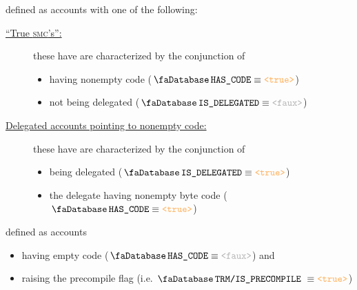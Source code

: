 \begin{description}
\begin{description}
		\end{description}
	\item[\underline{\underline{Smart contracts:}}]
		defined as accounts with
		one of the following:
		\begin{description}
			\item[\underline{``True \textsc{smc}'s'':}]
				these have are characterized by the conjunction of
				\begin{itemize}
					\item having nonempty code ($\accHasCode \equiv \true$)
					\item not being delegated ($\accIsDelegated \equiv \false$)
				\end{itemize}
			\item[\underline{Delegated accounts pointing to nonempty code:}]
				these have are characterized by the conjunction of
				\begin{itemize}
					\item being delegated ($\accIsDelegated \equiv \true$)
					\item the delegate having nonempty byte code ($\accHasCode \equiv \true$)
				\end{itemize}
		\end{description}
	\item[\underline{\underline{Precompiles:}}]
		defined as accounts
		\begin{itemize}
			\item having empty code ($\accHasCode \equiv \false$) and
			\item raising the precompile flag (i.e. $\accTrmIsPrecompile \equiv \true$)
		\end{itemize}
\end{description}
